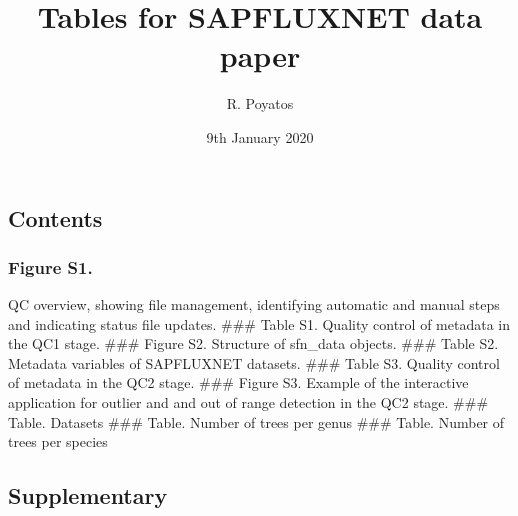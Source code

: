 \documentclass[]{article}
\title{Tables for SAPFLUXNET data paper}
\author{R. Poyatos}
\date{9th January 2020}
\begin{document}
\maketitle

\hypertarget{contents}{%
\subsection{Contents}\label{contents}}

\hypertarget{figure-s1.}{%
\subsubsection{Figure S1.}\label{figure-s1.}}

QC overview, showing file management, identifying automatic and manual
steps and indicating status file updates. \#\#\# Table S1. Quality
control of metadata in the QC1 stage. \#\#\# Figure S2. Structure of
sfn\_data objects. \#\#\# Table S2. Metadata variables of SAPFLUXNET
datasets. \#\#\# Table S3. Quality control of metadata in the QC2 stage.
\#\#\# Figure S3. Example of the interactive application for outlier and
and out of range detection in the QC2 stage. \#\#\# Table. Datasets
\#\#\# Table. Number of trees per genus \#\#\# Table. Number of trees
per species

\pagebreak

\hypertarget{supplementary}{%
\subsection{Supplementary}\label{supplementary}}

\pagebreak
\end{document}
